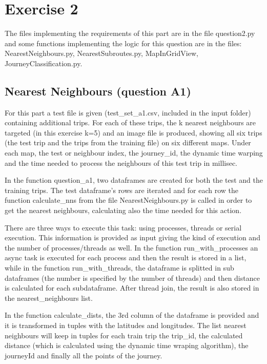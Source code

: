 \documentclass[12pt]{article}
\begin{document}
	\section{Exercise 2}
	The files implementing the requirements of this part are in the file question2.py and some functions implementing the logic for this question are in the files: NearestNeighbours.py, NearestSubroutes.py, MapInGridView, JourneyClassification.py.
	
	\subsection{Nearest Neighbours (question A1)}
	For this part a test file is given (test\_set\_a1.csv, included in the input folder) containing additional trips. For each of these trips, the k nearest neighbours are targeted (in this exercise k=5) and an image file is produced, showing all six trips (the test trip and the trips from the training file) on six different maps. Under each map, the test or neighbour index, the journey\_id, the dynamic time warping and the time needed to process the neighbours of this test trip in millisec.
	
	In the function question\_a1, two dataframes are created for both the test and the training trips. The test dataframe's rows are iterated and for each row the function calculate\_nns from the file NearestNeighbours.py is called in order to get the nearest neighbours, calculating also the time needed for this action.
	
	There are three ways to execute this task: using processes, threads or serial execution. This information is provided as input giving the kind of execution and the number of processes/threads as well. In the function run\_with\_processes an async task is executed for each process and then the result is stored in a list, while in the function run\_with\_threads, the dataframe is splitted in sub dataframes (the number is specified by the number of threads) and then distance is calculated for each subdataframe. After thread join, the result is also stored in the nearest\_neighbours list.
	
	In the function calculate\_dists, the 3rd column of the dataframe is provided and it is transformed in tuples with the latitudes and longitudes. The list nearest neighbours will keep in tuples for each train trip the trip\_id, the calculated distance (which is calculated using the dynamic time wraping algorithm), the journeyId and finally all the points of the journey. 
	
\end{document}

